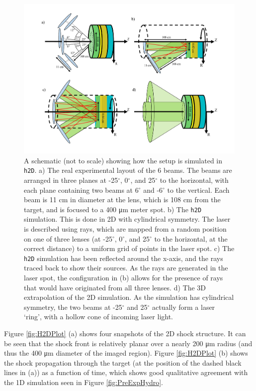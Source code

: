 \begin{figure}[hbt!]
\centering
\includegraphics[width=1\textwidth]{figures/Experiment/H2DSchematic.pdf}%
\caption{\label{fig:H2DSchematic} A schematic (not to scale) showing how the setup is simulated in \texttt{h2D}. a) The real experimental layout of the 6 beams. The beams are arranged in three planes at -25$^{\circ}$, 0$^{\circ}$, and 25$^{\circ}$ to the horizontal, with each plane containing two beams at 6$^{\circ}$ and -6$^{\circ}$ to the vertical. Each beam is 11 \unit{\centi\meter} in diameter at the lens, which is 108 \unit{\centi\meter} from the target, and is focused to a 400 \unit{\micro\meter} meter spot. b) The \texttt{h2D} simulation. This is done in 2D with cylindrical symmetry. The laser is described using rays, which are mapped from a random position on one of three lenses (at -25$^{\circ}$, 0$^{\circ}$, and 25$^{\circ}$ to the horizontal, at the correct distance) to a uniform grid of points in the laser spot. c) The \texttt{h2D} simulation has been reflected around the x-axis, and the rays traced back to show their sources. As the rays are generated in the laser spot, the configuration in (b) allows for the presence of rays that would have originated from all three lenses. d) The 3D extrapolation of the 2D simulation. As the simulation has cylindrical symmetry, the two beams at -25$^{\circ}$ and 25$^{\circ}$ actually form a laser `ring', with a hollow cone of incoming laser light.}
\end{figure}

Figure \ref{fig:H2DPlot} (a) shows four snapshots of the 2D shock structure. It can be seen that the shock front is relatively planar over a nearly 200 \unit{\micro\meter} radius (and thus the 400 \unit{\micro\meter} diameter of the imaged region). Figure \ref{fig:H2DPlot} (b) shows the shock propagation through the target (at the position of the dashed black lines in (a)) as a function of time, which shows good qualitative agreement with the 1D simulation seen in Figure \ref{fig:PreExpHydro}.

